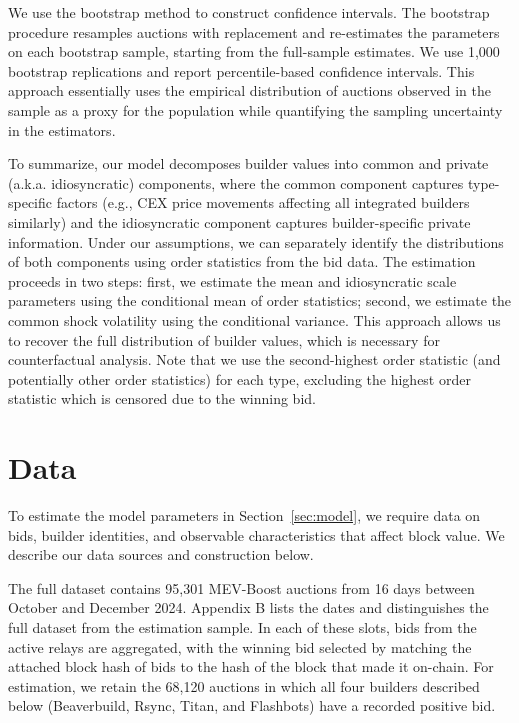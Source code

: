 \documentclass[12pt,reqno]{amsart}
\begin{document}
We use the bootstrap method to construct confidence intervals. The bootstrap procedure resamples auctions with replacement and re-estimates the parameters on each bootstrap sample, starting from the full-sample estimates. We use 1,000 bootstrap replications and report percentile-based confidence intervals. This approach essentially uses the empirical distribution of auctions observed in the sample as a proxy for the population while quantifying the sampling uncertainty in the estimators. %

To summarize, our model decomposes builder values into common and private (a.k.a. idiosyncratic) components, where the common component captures type-specific factors (e.g., CEX price movements affecting all integrated builders similarly) and the idiosyncratic component captures builder-specific private information. Under our assumptions, we can separately identify the distributions of both components using order statistics from the bid data. The estimation proceeds in two steps: first, we estimate the mean and idiosyncratic scale parameters using the conditional mean of order statistics; second, we estimate the common shock volatility using the conditional variance. This approach allows us to recover the full distribution of builder values, which is necessary for counterfactual analysis. Note that we use the second-highest order statistic (and potentially other order statistics) for each type, excluding the highest order statistic which is censored due to the winning bid.

\section{Data} \label{sec:data}
To estimate the model parameters in Section~\ref{sec:model}, we require data on bids, builder identities, and observable characteristics that affect block value. We describe our data sources and construction below.

The full dataset contains 95,301 MEV-Boost auctions from 16 days between October and December 2024. Appendix B lists the dates and distinguishes the full dataset from the estimation sample. In each of these slots, bids from the active relays are aggregated, with the winning bid selected by matching the attached block hash of bids to the hash of the block that made it on-chain. For estimation, we retain the 68,120 auctions in which all four builders described below (Beaverbuild, Rsync, Titan, and Flashbots) have a recorded positive bid.
\end{document}
